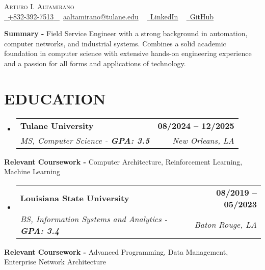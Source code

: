 \documentclass[letterpaper,11pt]{article}
\makeatletter
\newcommand{\resumeSubheading}[4]{
  \vspace{-2pt}\item
    \begin{tabular*}{1.0\textwidth}[t]{l@{\extracolsep{\fill}}r}
      \textbf{\large#1} & \textbf{\small #2} \\
      \textit{\large#3} & \textit{\small #4} \\
      
    \end{tabular*}\vspace{-7pt}
}
\newcommand{\resumeSubHeadingListStart}{\begin{itemize}[leftmargin=0.0in, label={}]}
\newcommand{\resumeSubHeadingListEnd}{\end{itemize}}
\makeatother
\begin{document}
\begin{center}
    {\Huge \scshape Arturo I. Altamirano} \\ \vspace{6pt}
        \vspace{-4pt}       
        \small \href{tel:+xxxxxxxxxxxx}{ \raisebox{-0.1\height}\faPhone\ \underline{+832-392-7513} ~}{\raisebox{-0.2\height}\faEnvelope\  \underline{aaltamirano@tulane.edu}} ~ 
    \href{https://www.linkedin.com/in/arturo-altamirano-462a26180/}{\raisebox{-0.2\height}\faLinkedinSquare\ \underline{LinkedIn}}  ~
    \href{https://github.com/aaltam6}{\raisebox{-0.2\height}\faGithub\ \underline{GitHub}} ~
\end{center}

\vspace{-3pt}

  \textbf{Summary - }{Field Service Engineer with a strong background in automation, computer networks, and industrial systems. Combines a solid academic foundation in computer science with extensive hands-on engineering experience and a passion for all forms and applications of technology.}

  \vspace{-6pt}
  
\section{EDUCATION}
  \resumeSubHeadingListStart
    \resumeSubheading
      {Tulane University}{08/2024 -- 12/2025}
      {MS, Computer Science - \textbf{GPA: 3.5}} {New Orleans, LA}
  \resumeSubHeadingListEnd

  \vspace{3pt}
  
      \textbf{Relevant Coursework - }{Computer Architecture, Reinforcement Learning, Machine Learning}
      
  \resumeSubHeadingListStart
    \resumeSubheading
      {Louisiana State University}{08/2019 -- 05/2023}
      {BS, Information Systems and Analytics - \textbf{GPA: 3.4}}{Baton Rouge, LA}
  \resumeSubHeadingListEnd

  \vspace{3pt}
  
  \textbf{Relevant Coursework - }{Advanced Programming, Data Management, Enterprise Network Architecture}
  
\end{document}
